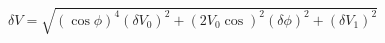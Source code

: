 \begin{equation}
\label{eq:delta_V_Malus}
\delta V = \sqrt{ \left(\cos{\phi}\right)^4(\delta V_0)^2 + \left(2V_0 \cos \right)^2(\delta \phi)^2+ (\delta V_1)^2}
\end{equation}